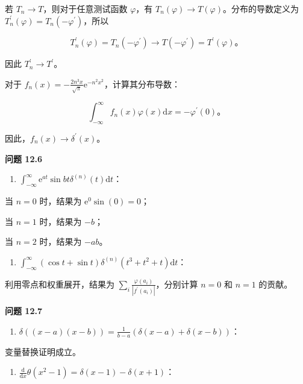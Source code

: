 若 \(T_{n} \rightarrow T\)，则对于任意测试函数 \(\varphi\)，有
\(T_{n}(\varphi) \rightarrow T(\varphi)\)。分布的导数定义为
\(T_{n}^{\prime}(\varphi) = T_{n}\left( - \varphi^{\prime} \right)\)，所以

\[T_{n}^{\prime}(\varphi) = T_{n}\left( - \varphi^{\prime} \right) \rightarrow T\left( - \varphi^{\prime} \right) = T^{\prime}(\varphi)。\]

因此 \(T_{n}^{\prime} \rightarrow T^{\prime}\)。

对于
\(f_{n}(x) = - \frac{2n^{3}x}{\sqrt{\pi}}\mathrm{e}^{- n^{2}x^{2}}\)，计算其分布导数：

\[\int_{- \infty}^{\infty}f_{n}(x)\varphi(x)\mathrm{d}x = - \varphi^{\prime}(0)。\]

因此，\(f_{n}(x) \rightarrow \delta^{\prime}(x)\)。

\textbf{问题 12.6}

\begin{enumerate}
\def\labelenumi{(\alph{enumi})}
\item
  \(\int_{- \infty}^{\infty}\mathrm{e}^{at}\sin bt\delta^{(n)}(t)\mathrm{d}t\)：
\end{enumerate}

当 \(n = 0\) 时，结果为 \(\mathrm{e}^{0}\sin(0) = 0\)；

当 \(n = 1\) 时，结果为 \(- b\)；

当 \(n = 2\) 时，结果为 \(- ab\)。

\begin{enumerate}
\def\labelenumi{(\alph{enumi})}
\setcounter{enumi}{1}
\item
  \(\int_{- \infty}^{\infty}\left( \cos t + \sin t \right)\delta^{(n)}\left( t^{3} + t^{2} + t \right)\mathrm{d}t\)：
\end{enumerate}

利用零点和权重展开，结果为
\(\sum_{i}\frac{\varphi\left( a_{i} \right)}{\left| f^{\prime}\left( a_{i} \right) \right|}\)，分别计算
\(n = 0\) 和 \(n = 1\) 的贡献。

\textbf{问题 12.7}

\begin{enumerate}
\def\labelenumi{(\alph{enumi})}
\item
  \(\delta\left( (x - a)(x - b) \right) = \frac{1}{b - a}\left( \delta(x - a) + \delta(x - b) \right)\)：
\end{enumerate}

变量替换证明成立。

\begin{enumerate}
\def\labelenumi{(\alph{enumi})}
\setcounter{enumi}{1}
\item
  \(\frac{\mathrm{d}}{\mathrm{d}x}\theta\left( x^{2} - 1 \right) = \delta(x - 1) - \delta(x + 1)\)：
\end{enumerate}

